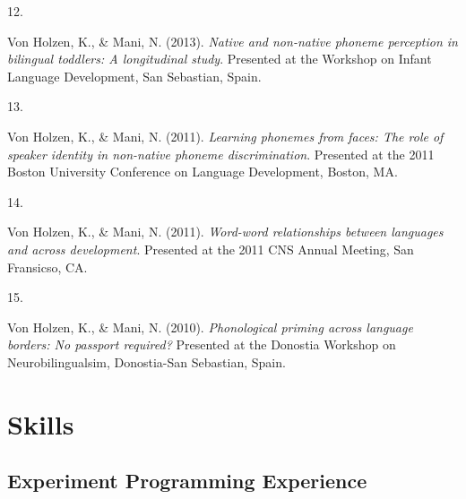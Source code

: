 \documentclass[10pt,a4paper,]{article}
\newlength{\cslhangindent}
\newlength{\csllabelwidth}
\newcommand{\CSLLeftMargin}[1]{\parbox[t]{\csllabelwidth}{\hfill #1~}}
\newcommand{\CSLRightInline}[1]{\parbox[t]{\linewidth - \cslhangindent - \csllabelwidth}{#1}\vspace{0.8ex}}
\begin{document}
\leavevmode{}%
\CSLLeftMargin{12. }%
\CSLRightInline{Von Holzen, K., \& Mani, N. (2013). \emph{Native and
non-native phoneme perception in bilingual toddlers: A longitudinal
study}. Presented at the Workshop on Infant Language Development, San
Sebastian, Spain.}

\leavevmode{}%
\CSLLeftMargin{13. }%
\CSLRightInline{Von Holzen, K., \& Mani, N. (2011). \emph{Learning
phonemes from faces: The role of speaker identity in non-native phoneme
discrimination}. Presented at the 2011 Boston University Conference on
Language Development, Boston, MA.}

\leavevmode{}%
\CSLLeftMargin{14. }%
\CSLRightInline{Von Holzen, K., \& Mani, N. (2011). \emph{Word-word
relationships between languages and across development}. Presented at
the 2011 CNS Annual Meeting, San Fransicso, CA.}

\leavevmode{}%
\CSLLeftMargin{15. }%
\CSLRightInline{Von Holzen, K., \& Mani, N. (2010). \emph{Phonological
priming across language borders: No passport required?} Presented at the
Donostia Workshop on Neurobilingualsim, Donostia-San Sebastian, Spain.}

\hypertarget{skills}{%
\section{Skills}\label{skills}}

\hypertarget{experiment-programming-experience}{%
\subsection{Experiment Programming
Experience}\label{experiment-programming-experience}}
\end{document}

